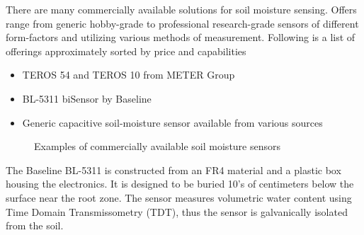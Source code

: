 
There are many commercially available solutions for soil moisture sensing. Offers range from generic hobby-grade to professional research-grade sensors of different form-factors and utilizing various methods of measurement. Following is a list of offerings approximately sorted by price and capabilities
\begin{itemize}
    \item TEROS 54 and TEROS 10 from METER Group \cite{meter_group_teros_2024, meter_group_teros_nodate}
    \item BL-5311 biSensor by Baseline \cite{baseline_soil_2021}
    \item Generic capacitive soil-moisture sensor available from various sources \cite{czechproject_spol_sro_pudni_2024}
\end{itemize}

\begin{figure}
    \centering
    \caption{\label{fig:soil-sensors}Examples of commercially available soil moisture sensors \cite{meter_group_teros_nodate, baseline_soil_2021, czechproject_spol_sro_pudni_2024}}
\end{figure}

The Baseline BL-5311 is constructed from an FR4 material and a plastic box housing the electronics. It is designed to be buried 10's of centimeters below the surface near the root zone. The sensor measures volumetric water content using Time Domain Transmissometry (TDT), thus the sensor is galvanically isolated from the soil.

